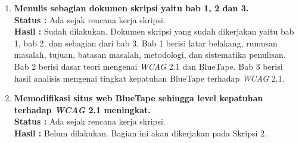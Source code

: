\documentclass[a4paper,twoside]{article}
\begin{document}
\begin{enumerate}
		\begin{lstlisting}[frame=single, label={lst:4.1.2_role_halaman_lihat_jadwal_dosen}, language=HTML, caption=Kriteria Sukses 4.1.1 - Atribut \textit{Role} pada Halaman Lihat Jadwal Dosen]
			<li class="tabs-title is-active">
				<a href="#hal0" aria-selected="true">HIZKIA STEVEN</a>
			</li> 
		\end{lstlisting}

		\paragraph{Kriteria Sukses 4.1.3 \textit{Status Messages}}
		\label{par:kepatuhan_bluetape_kriteria_sukses_4.1.3}
		(Tidak Sukses)\\

		Kriteria ini tidak sukses dipatuhi karena setiap pesan status yang ditampilkan kepada pengguna tidak memiliki atribute \textit{"role"} dengan nilai \textit{"alert"} sehingga teknologi alat bantu tidak dapat mengidentifikasi serta menginformasikan pesan tersebut kepada pengguna. Letak kesalahan dapat dilihat pada potongan kode \ref{lst:4.1.3_pesan_status}.

		\begin{lstlisting}[frame=single, label={lst:4.1.3_pesan_status}, language=PHP, caption=Kriteria Sukses 4.1.3 - Atribut pada Pesan Status]
			<?php if (isset($_SESSION['error'])): ?>
				<div class="callout alert"><?= $_SESSION['error'] ?></div>
			<?php endif; ?>
			<?php if (isset($_SESSION['info'])): ?>
				<div class="callout primary"><?= $_SESSION['info'] ?></div>
			<?php endif; ?>
		\end{lstlisting}

		\item \textbf{Menulis sebagian dokumen skripsi yaitu bab 1, 2 dan 3.}\\
		{\bf Status :} Ada sejak rencana kerja skripsi.\\
		{\bf Hasil :} Sudah dilakukan. Dokumen skripsi yang sudah dikerjakan yaitu bab 1, bab 2, dan sebagian dari bab 3. Bab 1 berisi latar belakang, rumusan masalah, tujuan, batasan masalah, metodologi, dan sistematika penulisan. Bab 2 berisi dasar teori mengenai \textit{WCAG} 2.1 dan BlueTape. Bab 3 berisi hasil analisis mengenai tingkat kepatuhan BlueTape terhadap \textit{WCAG} 2.1.

		\item \textbf{Memodifikasi situs web BlueTape sehingga level kepatuhan terhadap \textit{WCAG} 2.1 meningkat.}\\
		{\bf Status :} Ada sejak rencana kerja skripsi.\\
		{\bf Hasil :} Belum dilakukan. Bagian ini akan dikerjakan pada Skripsi 2.


\end{enumerate}
\end{document}
